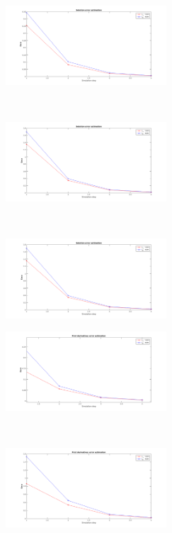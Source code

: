 \documentclass[12pt,openany,twoside,a4paper]{article}
\begin{document}
\begin{figure}[H]
    \begin{subfigure}[h]{0.3\textwidth}
        \includegraphics[keepaspectratio,width=6cm]{sinx_error.png}
    \end{subfigure}
     ~ \;
     \begin{subfigure}[h]{0.3\textwidth}
        \includegraphics[keepaspectratio,width=6cm]{sin2x_error.png}
    \end{subfigure}
     ~ \;
     \begin{subfigure}[h]{0.3\textwidth}
        \includegraphics[keepaspectratio,width=6cm]{sinpix_error.png}
    \end{subfigure}
     \newline
    \begin{subfigure}[h]{0.3\textwidth}
        \includegraphics[keepaspectratio,width=6cm]{cosx_error.png}
    \end{subfigure}
     ~ \;
     \begin{subfigure}[h]{0.3\textwidth}
        \includegraphics[keepaspectratio,width=6cm]{cos2x_error.png}

\end{subfigure}
\end{figure}
\end{document}
